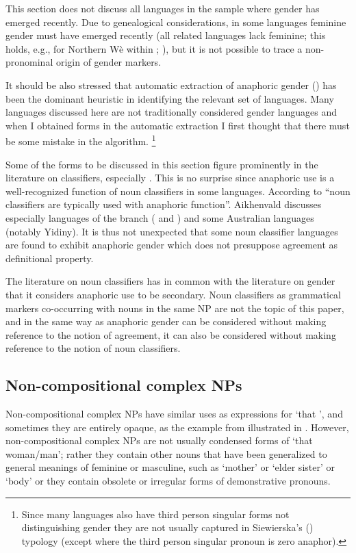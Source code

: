 \documentclass[output=collectionpaper]{langsci/langscibook}
\begin{document}
This section does not discuss all languages in the sample where gender has emerged recently. Due to genealogical considerations, in some languages feminine gender must have emerged recently (all related languages lack feminine; this holds, e.g., for Northern Wè within ; \citealt{Paradis1983}), but it is not possible to trace a non-pronominal origin of gender markers.

It should be also stressed that automatic extraction of anaphoric gender () has been the dominant heuristic in identifying the relevant set of languages. Many languages discussed here are not traditionally considered gender languages and when I obtained forms in the automatic extraction I first thought that there must be some mistake in the algorithm.%
\footnote{%
Since many languages also have third person singular forms not distinguishing gender they are not usually captured in Siewierska’s (\citeyear{Siewierska2005}) typology (except  where the third person singular pronoun is zero anaphor).
}%

Some of the forms to be discussed in this section figure prominently in the literature on classifiers, especially . This is no surprise since anaphoric use is a well-recognized function of noun classifiers in some languages. According to \citet[87]{Aikhenvald2000} “noun classifiers are typically used with anaphoric function”. Aikhenvald discusses especially  languages of the  branch ( and ) and some Australian languages (notably Yidiny). It is thus not unexpected that some noun classifier languages are found to exhibit anaphoric gender which does not presuppose agreement as definitional property.

The literature on noun classifiers has in common with the literature on gender that it considers anaphoric use to be secondary. Noun classifiers as grammatical markers co-occurring with nouns in the same NP are not the topic of this paper, and in the same way as anaphoric gender can be considered without making reference to the notion of agreement, it can also be considered without making reference to the notion of noun classifiers.


\subsection{Non-compositional complex NPs}
\label{sec:BW:5.2}
\largerpage
Non-compositional complex NPs have similar uses as expressions for ‘that ’, and sometimes they are entirely opaque, as the example from  illustrated in . However, non-compositional complex NPs are not usually condensed forms of ‘that woman/man’; rather they contain other nouns that have been generalized to general meanings of feminine or masculine, such as ‘mother’ or ‘elder sister’ or ‘body’ or they contain obsolete or irregular forms of demonstrative pronouns.
\end{document}
